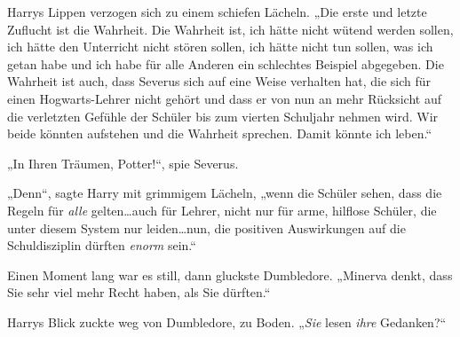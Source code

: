 Harrys Lippen verzogen sich zu einem schiefen Lächeln. „Die erste und letzte Zuflucht ist die Wahrheit. Die Wahrheit ist, ich hätte nicht wütend werden sollen, ich hätte den Unterricht nicht stören sollen, ich hätte nicht tun sollen, was ich getan habe und ich habe für alle Anderen ein schlechtes Beispiel abgegeben. Die Wahrheit ist auch, dass Severus sich auf eine Weise verhalten hat, die sich für einen Hogwarts-Lehrer nicht gehört und dass er von nun an mehr Rücksicht auf die verletzten Gefühle der Schüler bis zum vierten Schuljahr nehmen wird. Wir beide könnten aufstehen und die Wahrheit sprechen. Damit könnte ich leben.“

„In Ihren Träumen, Potter!“, spie Severus.

„Denn“, sagte Harry mit grimmigem Lächeln, „wenn die Schüler sehen, dass die Regeln für \emph{alle} gelten…auch für Lehrer, nicht nur für arme, hilflose Schüler, die unter diesem System nur leiden…nun, die positiven Auswirkungen auf die Schuldisziplin dürften \emph{enorm} sein.“

Einen Moment lang war es still, dann gluckste Dumbledore. „Minerva denkt, dass Sie sehr viel mehr Recht haben, als Sie dürften.“

Harrys Blick zuckte weg von Dumbledore, zu Boden. „\emph{Sie} lesen \emph{ihre} Gedanken?“


